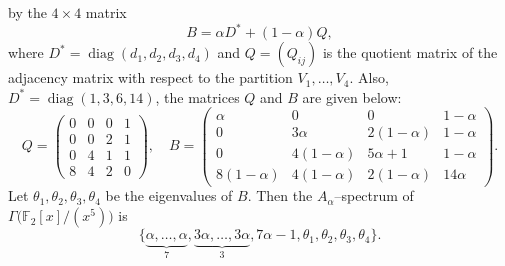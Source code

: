 \documentclass[12pt,twoside]{article}
\begin{document}
	by the $4\times 4$ matrix
	\[
	B = \alpha D^\ast + (1-\alpha)Q,
	\]
	where $D^\ast = \operatorname{diag}(d_1,d_2,d_3,d_4)$ and $Q=(Q_{ij})$ is the
	quotient matrix of the adjacency matrix with respect to the partition
	$V_1,\dots,V_4$. Also, $D^\ast = \operatorname{diag}(1,3,6,14)$, the matrices  $Q$ and $B$ are given below:
	\[
	Q =
	\begin{pmatrix}
		0 & 0 & 0 & 1\\
		0 & 0 & 2 & 1\\
		0 & 4 & 1 & 1\\
		8 & 4 & 2 & 0
	\end{pmatrix},
	\quad B =
	\begin{pmatrix}
		\alpha & 0 & 0 & 1-\alpha\\[3pt]
		0 & 3\alpha & 2(1-\alpha) & 1-\alpha\\[3pt]
		0 & 4(1-\alpha) & 5\alpha+1 & 1-\alpha\\[3pt]
		8(1-\alpha) & 4(1-\alpha) & 2(1-\alpha) & 14\alpha
	\end{pmatrix}.
	\]
	Let $\theta_1,\theta_2,\theta_3,\theta_4$ be the eigenvalues of $B$. Then the $A_\alpha$--spectrum of
	$ \varGamma\bigl(\mathbb{F}_2[x]/(x^5)\bigr)$ is
	\[
	\bigl\{
	\underbrace{\alpha,\dots,\alpha}_{7},
	\underbrace{3\alpha,\dots,3\alpha}_{3},
	7\alpha-1,
	\theta_1,\theta_2,\theta_3,\theta_4
	\bigr\}.
	\]
\end{document}
